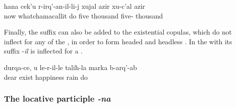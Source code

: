 \begin{exe}
	\ex	\label{ex:‎now for the one who operates her 5000, 50000 rubles}
	\gll	hana	cek'u	r-irq'-an-il-li-j	xujal	azir	xu-c'al	azir\\
		now	whatchamacallit	do	five	thousand	five-	thousand\\
	\glt	{}
\end{exe}

Finally, the suffix  can also be added to the existential copulas, which do not inflect for any of the , in order to form headed and headless  . In  the  with its suffix -\textit{il} is inflected for a .
%
\begin{exe}
	\ex	\label{ex:‎My dear, may on the place where you (fem.) are rain the rain of happiness}
	\gll	durqa-ce,	u	le-r-il-le	taliħ-la	marka	b-arq'-ab\\
		dear		exist	happiness	rain	do\\
	\glt	{}
\end{exe}


\subsubsection{The locative participle \textit{-na}}
\label{sssec:The locative participle}

